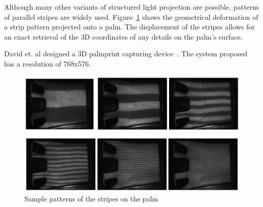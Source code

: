 Although many other variants of structured light projection are possible, patterns of parallel stripes are widely used. Figure~\ref{fig:pastwork:strippattern} shows the geometrical deformation of a strip pattern projected onto a palm. The displacement of the stripes allows for an exact retrieval of the 3D coordinates of any details on the palm's surface.

David et. al designed a 3D palmprint capturing device~\cite{Zhang:2008kc}. The system proposed has a resolution of 768x576.

\begin{figure}[htb]
  \begin{center}
    \includegraphics[width=0.9\linewidth]{ch-pastwork/figures/strippattern}
    \caption[Sample patterns of the stripes on the palm]{Sample patterns of the stripes on the palm~\cite{Li:2009eq}}
    \label{fig:pastwork:strippattern}
  \end{center}
\end{figure}
